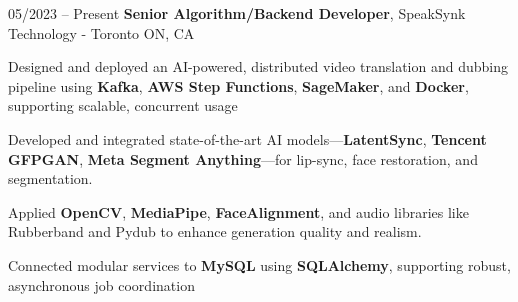 \begin{twocolentry}{
    05/2023 – Present
}
\fontsize{11 pt}{11 pt}\textbf{Senior Algorithm/Backend Developer}, SpeakSynk Technology - Toronto ON, CA\end{twocolentry}

\vspace{0.10 cm}
\begin{onecolentry}
    \begin{highlights}
        \item Designed and deployed an AI-powered, distributed video translation and dubbing pipeline using \textbf{Kafka}, \textbf{AWS Step Functions}, \textbf{SageMaker}, and \textbf{Docker}, supporting scalable, concurrent usage
        \item Developed and integrated state-of-the-art AI models—\textbf{LatentSync}, \textbf{Tencent GFPGAN}, \textbf{Meta Segment Anything}—for lip-sync, face restoration, and segmentation.
        \item Applied \textbf{OpenCV}, \textbf{MediaPipe}, \textbf{FaceAlignment}, and audio libraries like Rubberband and Pydub to enhance generation quality and realism.
        \item Connected modular services to \textbf{MySQL} using \textbf{SQLAlchemy}, supporting robust, asynchronous job coordination
    \end{highlights}
\end{onecolentry}
